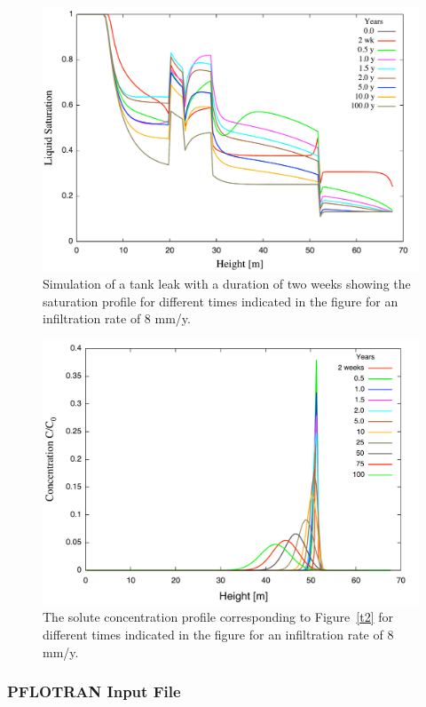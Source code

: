 \begin{figure}[h]\centering
\includegraphics[scale=0.45]{./figs/sat_leak}
\caption{Simulation of a tank leak with a duration of two weeks showing the saturation profile for different times indicated in the figure for an infiltration rate of 8 mm/y.}\label{f2}
\end{figure}

\begin{figure}[h]\centering
\includegraphics[scale=0.45]{./figs/conc}
\caption{The solute concentration profile corresponding to Figure~\ref{t2} for different times indicated in the figure for an infiltration rate of 8 mm/y.}\label{f3}
\end{figure}

\clearpage

\subsubsection{PFLOTRAN Input File}


